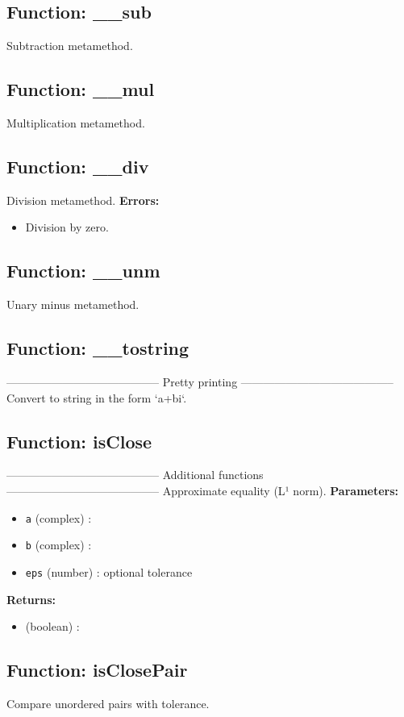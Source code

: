 \documentclass{article}
\begin{document}
\subsection*{Function: \_\_sub}
Subtraction metamethod.
\hrulefill

\subsection*{Function: \_\_mul}
Multiplication metamethod.
\hrulefill

\subsection*{Function: \_\_div}
Division metamethod.
\textbf{Errors:}
\begin{itemize}
\item Division by zero.
\end{itemize}
\hrulefill

\subsection*{Function: \_\_unm}
Unary minus metamethod.
\hrulefill

\subsection*{Function: \_\_tostring}
----------------------------------------- Pretty printing ----------------------------------------- Convert to string in the form `a+bi`.
\hrulefill

\subsection*{Function: isClose}
----------------------------------------- Additional functions ----------------------------------------- Approximate equality (L¹ norm).
\textbf{Parameters:}
\begin{itemize}
\item \texttt{a} (complex) : 
\item \texttt{b} (complex) : 
\item \texttt{eps} (number) : optional tolerance
\end{itemize}
\textbf{Returns:}
\begin{itemize}
\item (boolean) : 
\end{itemize}
\hrulefill

\subsection*{Function: isClosePair}
Compare unordered pairs with tolerance.
\hrulefill
\end{document}

